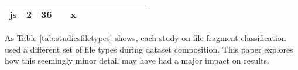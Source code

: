 \begin{table}[!ht]
\begin{tabular}{|l|l|l|l|l|l|l|l|l|l|l|l|}
js        & 2               & 36            &   & x &   &   &   &   &   &   &     \\ \hline
\end{tabular}
\end{table}


As Table \ref{tab:studiesfiletypes} shows, each study on file fragment classification used a different set of file types during dataset composition. This paper explores how this seemingly minor detail may have had a major impact on results.